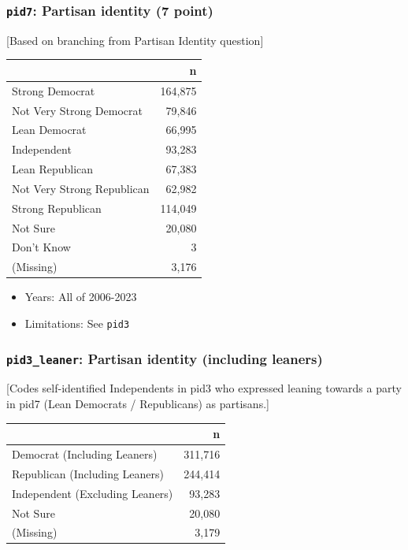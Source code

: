 \documentclass[10pt,article,oneside]{memoir}
\theoremstyle{definition}
\begin{document}
\subsubsection{\texorpdfstring{\texttt{pid7}: Partisan identity (7
point)}{pid7: Partisan identity (7 point)}}\label{pid7-partisan-identity-7-point}

{[}Based on branching from Partisan Identity question{]}

\begin{table}[H]
\centering
\begin{tabular}[t]{lr}
\toprule
 & n\\
\midrule
Strong Democrat & 164,875\\
Not Very Strong Democrat & 79,846\\
Lean Democrat & 66,995\\
Independent & 93,283\\
Lean Republican & 67,383\\
Not Very Strong Republican & 62,982\\
Strong Republican & 114,049\\
Not Sure & 20,080\\
Don't Know & 3\\
(Missing) & 3,176\\
\bottomrule
\end{tabular}
\end{table}

\begin{itemize}
\tightlist
\item
  Years: All of 2006-2023
\item
  Limitations: See \texttt{pid3}
\end{itemize}

\subsubsection{\texorpdfstring{\texttt{pid3\_leaner}: Partisan identity
(including
leaners)}{pid3\_leaner: Partisan identity (including leaners)}}\label{pid3_leaner-partisan-identity-including-leaners}

{[}Codes self-identified Independents in pid3 who expressed leaning
towards a party in pid7 (Lean Democrats / Republicans) as partisans.{]}

\begin{table}[H]
\centering
\begin{tabular}[t]{lr}
\toprule
 & n\\
\midrule
Democrat (Including Leaners) & 311,716\\
Republican (Including Leaners) & 244,414\\
Independent (Excluding Leaners) & 93,283\\
Not Sure & 20,080\\
(Missing) & 3,179\\
\bottomrule
\end{tabular}
\end{table}
\end{document}
